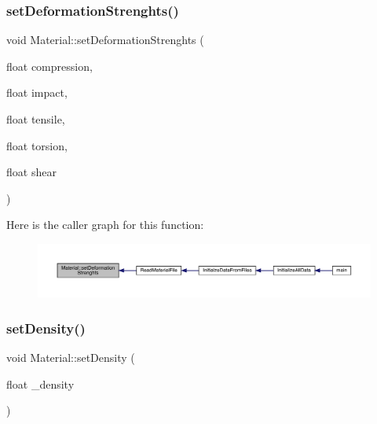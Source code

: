 \mbox{\label{class_material_a24b0f9d7ae4787f66ef055f70f63b240}} 
\subsubsection{\texorpdfstring{set\+Deformation\+Strenghts()}{setDeformationStrenghts()}}
{\footnotesize\ttfamily void Material\+::set\+Deformation\+Strenghts (\begin{DoxyParamCaption}\item[{float}]{compression,  }\item[{float}]{impact,  }\item[{float}]{tensile,  }\item[{float}]{torsion,  }\item[{float}]{shear }\end{DoxyParamCaption})}

Here is the caller graph for this function\+:
\nopagebreak
\begin{figure}[H]
\begin{center}
\leavevmode
\includegraphics[width=350pt]{dc/dee/class_material_a24b0f9d7ae4787f66ef055f70f63b240_icgraph}
\end{center}
\end{figure}
\mbox{\label{class_material_ab7aca2e9daaf35b5b8a45ee677c07073}} 
\subsubsection{\texorpdfstring{set\+Density()}{setDensity()}}
{\footnotesize\ttfamily void Material\+::set\+Density (\begin{DoxyParamCaption}\item[{float}]{\+\_\+density }\end{DoxyParamCaption})}

